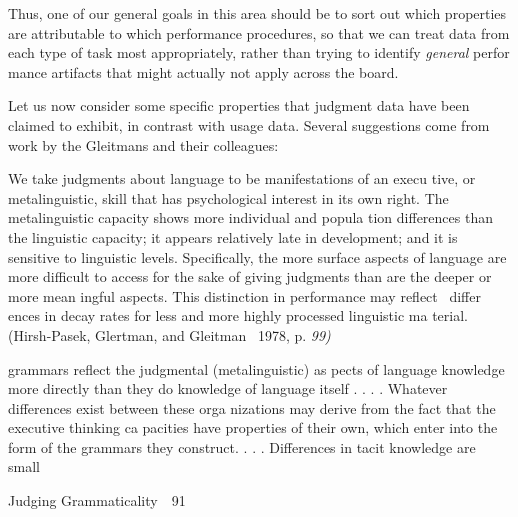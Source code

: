 \begin{styleStandard}
Thus, one of our general goals in this area should be to sort out which properties are attributable to which performance procedures, so that we can treat data from each type of task most appropriately, rather than trying to identify \textit{general}\textit{ }perfor\- mance artifacts that might actually not apply across the board.
\end{styleStandard}


\begin{styleStandard}
Let us now consider some specific properties that judgment data have been claimed to exhibit, in contrast with usage data. Several suggestions come from work by the Gleitmans and their colleagues:
\end{styleStandard}


\begin{styleStandard}
We take judgments about language to be manifestations of an execu\- tive, or metalinguistic, skill that has psychological interest in its own right. The metalinguistic capacity shows more individual and popula\- tion differences than the linguistic capacity; it appears relatively late in development; and it is sensitive to linguistic levels. Specifically, the more {\textquotedbl}surface{\textquotedbl} aspects of language are more difficult to access for the sake of giving judgments than are the {\textquotedbl}deeper{\textquotedbl} or more mean\- ingful aspects. This distinction in performance may reflect \ differ\- ences in decay rates for less and more highly processed linguistic ma\- terial. (Hirsh-Pasek, Glertman, and Gleitman \ 1978, p. \textit{9}\textit{9}\textit{)}
\end{styleStandard}


\begin{styleStandard}
[Generative] grammars reflect the judgmental ({\textquotedbl}metalinguistic{\textquotedbl}) as\- pects of language knowledge more directly than they do knowledge of language itself . . . . Whatever differences exist between these orga\- nizations may derive from the fact that the {\textquotedbl}executive{\textquotedbl} thinking ca\- pacities have properties of their own, which enter into the form of the grammars they construct. . . . Differences in tacit knowledge are small
\end{styleStandard}


\clearpage\setcounter{page}{1}\begin{styleStandard}
Judging Grammaticality\ \ 91
\end{styleStandard}


